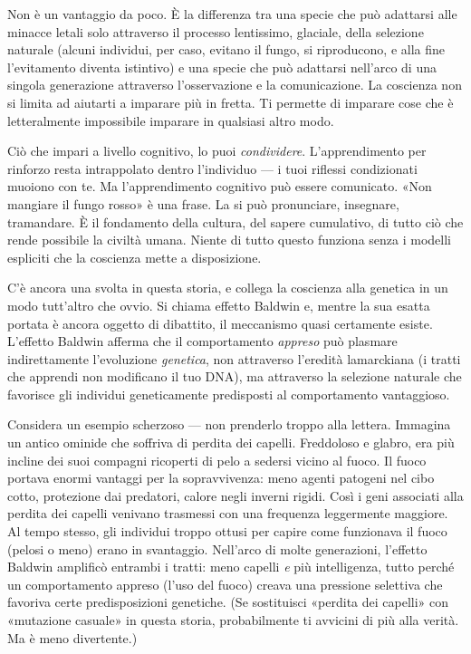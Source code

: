 \documentclass[11pt, twoside, openright]{book}
\begin{document}
Non è un vantaggio da poco. È la differenza tra una specie che può adattarsi alle minacce letali solo attraverso il processo lentissimo, glaciale, della selezione naturale (alcuni individui, per caso, evitano il fungo, si riproducono, e alla fine l'evitamento diventa istintivo) e una specie che può adattarsi nell'arco di una singola generazione attraverso l'osservazione e la comunicazione. La coscienza non si limita ad aiutarti a imparare più in fretta. Ti permette di imparare cose che è letteralmente impossibile imparare in qualsiasi altro modo.

Ciò che impari a livello cognitivo, lo puoi \textit{condividere}. L'apprendimento per rinforzo resta intrappolato dentro l'individuo --- i tuoi riflessi condizionati muoiono con te. Ma l'apprendimento cognitivo può essere comunicato. «Non mangiare il fungo rosso» è una frase. La si può pronunciare, insegnare, tramandare. È il fondamento della cultura, del sapere cumulativo, di tutto ciò che rende possibile la civiltà umana. Niente di tutto questo funziona senza i modelli espliciti che la coscienza mette a disposizione.

C'è ancora una svolta in questa storia, e collega la coscienza alla genetica in un modo tutt'altro che ovvio. Si chiama effetto Baldwin e, mentre la sua esatta portata è ancora oggetto di dibattito, il meccanismo quasi certamente esiste. L'effetto Baldwin afferma che il comportamento \textit{appreso} può plasmare indirettamente l'evoluzione \textit{genetica}, non attraverso l'eredità lamarckiana (i tratti che apprendi non modificano il tuo DNA), ma attraverso la selezione naturale che favorisce gli individui geneticamente predisposti al comportamento vantaggioso.

Considera un esempio scherzoso --- non prenderlo troppo alla lettera. Immagina un antico ominide che soffriva di perdita dei capelli. Freddoloso e glabro, era più incline dei suoi compagni ricoperti di pelo a sedersi vicino al fuoco. Il fuoco portava enormi vantaggi per la sopravvivenza: meno agenti patogeni nel cibo cotto, protezione dai predatori, calore negli inverni rigidi. Così i geni associati alla perdita dei capelli venivano trasmessi con una frequenza leggermente maggiore. Al tempo stesso, gli individui troppo ottusi per capire come funzionava il fuoco (pelosi o meno) erano in svantaggio. Nell'arco di molte generazioni, l'effetto Baldwin amplificò entrambi i tratti: meno capelli \textit{e} più intelligenza, tutto perché un comportamento appreso (l'uso del fuoco) creava una pressione selettiva che favoriva certe predisposizioni genetiche. (Se sostituisci «perdita dei capelli» con «mutazione casuale» in questa storia, probabilmente ti avvicini di più alla verità. Ma è meno divertente.)
\end{document}
